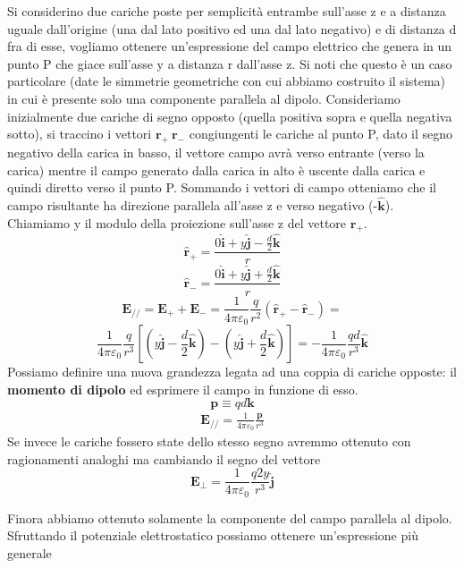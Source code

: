 \documentclass[
10pt, %
a4paper, %
oneside, %
headinclude,footinclude, %
BCOR5mm, %
]{scrartcl}
\begin{document}
\begin{esercizio}
	Si considerino due cariche poste per semplicità entrambe sull'asse z e a distanza uguale dall'origine (una dal lato positivo ed una dal lato negativo) e di distanza d fra di esse, vogliamo ottenere un'espressione del campo elettrico che genera in un punto P che giace sull'asse y a distanza r dall'asse z. Si noti che questo è un caso particolare (date le simmetrie geometriche con cui abbiamo costruito il sistema) in cui è presente solo una componente parallela al dipolo. Consideriamo inizialmente due cariche di segno opposto (quella positiva sopra e quella negativa sotto), si traccino i vettori \(\mathbf{r}_+ \ \mathbf{r}_- \) congiungenti le cariche al punto P, dato il segno negativo della carica in basso, il vettore campo avrà verso entrante (verso la carica) mentre il campo generato dalla carica in alto è uscente dalla carica e quindi diretto verso il punto P. Sommando i vettori di campo otteniamo che il campo risultante ha direzione parallela all'asse z e verso negativo (-$\hat{\mathbf{k}}$). Chiamiamo y il modulo della proiezione sull'asse z del vettore $\mathbf{r}_+$.
	\[\hat{\mathbf{r}}_+ =\frac{ 0\hat{\mathbf{i}}+y \hat{\mathbf{j}}-\frac{d}{2}\hat{\mathbf{k}}}{r}\]
	\[\hat{\mathbf{r}}_- = \frac{0\hat{\mathbf{i}}+y \hat{\mathbf{j}}+\frac{d}{2}\hat{\mathbf{k}}}{r}\]
	\[\mathbf{E}_{//} = \mathbf{E}_{+} + \mathbf{E}_{-} = \frac{1}{4\pi\varepsilon_0}\frac{q}{r^2}\left(\hat{\mathbf{r}}_+-\hat{\mathbf{r}}_-\right)=\]
	\[\frac{1}{4\pi\varepsilon_0}\frac{q}{r^3}\left[(y\hat{\mathbf{j}}-\frac{d}{2}\hat{\mathbf{k}})-(y\hat{\mathbf{j}}+\frac{d}{2}\hat{\mathbf{k}})\right]= -\frac{1}{4\pi\varepsilon_0}\frac{q d}{r^3}\hat{\mathbf{k}}\]
	Possiamo definire una nuova grandezza legata ad una coppia di cariche opposte: il \textbf{momento di dipolo} ed esprimere il campo in funzione di esso.
	\[\mathbf{p} \equiv qd\mathbf{k}\]
	\begin{align}\label{eq:campo_dipolo}
		\mathbf{E}_{//} = \frac{1}{4\pi\varepsilon_0}\frac{\mathbf{p}}{r^3}
	\end{align}
	Se invece le cariche fossero state dello stesso segno avremmo ottenuto con ragionamenti analoghi ma cambiando il segno del vettore
	\[\mathbf{E}_{\perp} = \frac{1}{4\pi\varepsilon_0}\frac{q2y}{r^3}\hat{\mathbf{j}}\]
\end{esercizio}
Finora abbiamo ottenuto solamente la componente del campo parallela al dipolo. Sfruttando il potenziale elettrostatico possiamo ottenere un'espressione più generale
\end{document}
